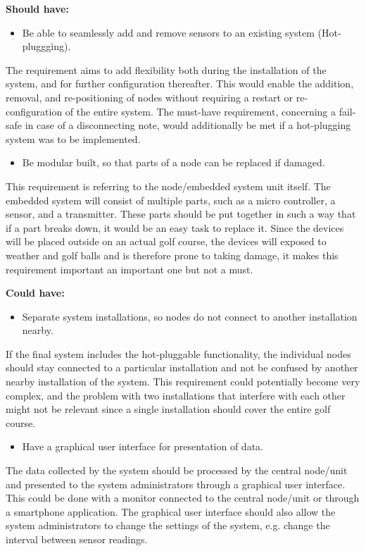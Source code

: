 \textbf{Should have:}
\begin{itemize}
\item Be able to seamlessly add and remove sensors to an existing system (Hot-pluggging).
\end{itemize}
The requirement aims to add flexibility both during the installation of the system, and for further configuration thereafter. This would enable the addition, removal, and re-positioning of nodes without requiring a restart or re-configuration of the entire system. The must-have requirement, concerning a fail-safe in case of a disconnecting note, would additionally be met if a hot-plugging system was to be implemented.


\begin{itemize}
\item Be modular built, so that parts of a node can be replaced if damaged.
\end{itemize}
This requirement is referring to the node/embedded system unit itself. The embedded system will consist of multiple parts, such as a micro controller, a sensor, and a transmitter. These parts should be put together in such a way that if a part breaks down, it would be an easy task to replace it. Since the devices will be placed outside on an actual golf course, the devices will exposed to weather and golf balls and is therefore prone to taking damage, it makes this requirement important an important one but not a must.


\textbf{Could have:}
\begin{itemize}
\item Separate system installations, so nodes do not connect to another installation nearby.
\end{itemize}
If the final system includes the hot-pluggable functionality, the individual nodes should stay connected to a particular installation and not be confused by another nearby installation of the system. This requirement could potentially become very complex, and the problem with two installations that interfere with each other might not be relevant since a single installation should cover the entire golf course.

\begin{itemize}
\item Have a graphical user interface for presentation of data.
\end{itemize}
The data collected by the system should be processed by the central node/unit and presented to the system administrators through a graphical user interface. This could be done with a monitor connected to the central node/unit or through a smartphone application. The graphical user interface should also allow the system administrators to change the settings of the system, e.g. change the interval between sensor readings.







